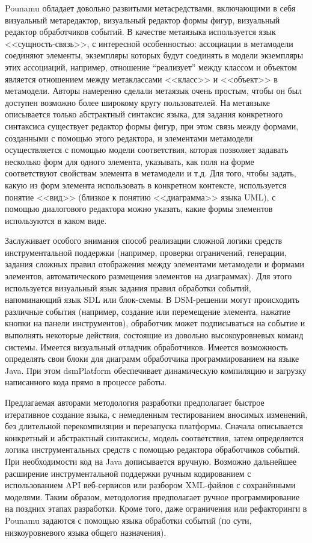 Pounamu обладает довольно развитыми метасредствами, включающими в себя визуальный 
метаредактор, визуальный редактор формы фигур, визуальный редактор обработчиков событий. 
В качестве метаязыка используется язык <<сущность-связь>>, с интересной особенностью: 
ассоциации в метамодели соединяют элементы, экземпляры которых будут соединять в модели 
экземпляры этих ассоциаций, например, отношение “реализует” между классом и объектом 
является отношением между метаклассами <<класс>> и <<объект>> в метамодели. Авторы 
намеренно сделали метаязык очень простым, чтобы он был доступен возможно более широкому 
кругу пользователей. На метаязыке описывается только абстрактный синтаксис языка, для 
задания конкретного синтаксиса существует редактор формы фигур, при этом связь между 
формами, созданными с помощью этого редактора, и элементами метамодели осуществляется 
с помощью модели соответствия, которая позволяет задавать несколько форм для одного 
элемента, указывать, как поля на форме соответствуют свойствам элемента в метамодели 
и т.д. Для того, чтобы задать, какую из форм элемента использовать в конкретном контексте, 
используется понятие <<вид>> (близкое к понятию <<диаграмма>> языка UML), с помощью 
диалогового редактора можно указать, какие формы элементов используются в каком виде.

Заслуживает особого внимания способ реализации сложной логики средств инструментальной 
поддержки (например, проверки ограничений, генерации, задания сложных правил отображения 
между элементами метамодели и формами элементов, автоматического размещения элементов 
на диаграммах). Для этого используется визуальный язык задания правил обработки событий, 
напоминающий язык SDL или блок-схемы. В \ac{DSM}-решении могут происходить различные события 
(например, создание или перемещение элемента, нажатие кнопки на панели инструментов), 
обработчик может подписываться на событие и выполнять некоторые действия, состоящие из 
довольно высокоуровневых команд системы. Имеется визуальный отладчик обработчиков. 
Имеется возможность определять свои блоки для диаграмм обработчика программированием 
на языке Java. При этом \ac{dsmPlatform} обеспечивает динамическую компиляцию и загрузку 
написанного кода прямо в процессе работы.

Предлагаемая авторами методология разработки предполагает быстрое итеративное создание 
языка, с немедленным тестированием вносимых изменений, без длительной перекомпиляции 
и перезапуска платформы. Сначала описывается конкретный и абстрактный синтаксисы, 
модель соответствия, затем определяется логика инструментальных средств с помощью 
редактора обработчиков событий. При необходимости код на Java дописывается вручную. 
Возможно дальнейшее расширение инструментальной поддержки ручным кодированием с использованием 
API веб-сервисов или разбором XML-файлов с сохранёнными моделями. Таким образом, методология 
предполагает ручное программирование на поздних этапах разработки. Кроме того, даже 
ограничения или рефакторинги в Pounamu задаются с помощью языка обработки событий 
(по сути, низкоуровневого языка общего назначения).

